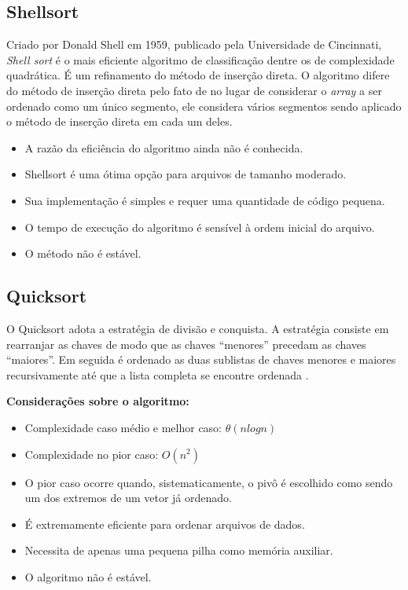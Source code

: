 \documentclass[
	11pt,
	oneside,
	a4paper,
	english,
	brazil,
	]{article}
\begin{document}
\subsection{Shellsort}
Criado por Donald Shell em 1959, publicado pela Universidade de Cincinnati,
\textit{Shell sort} é o mais eficiente algoritmo de classificação dentre os
de complexidade quadrática. É um refinamento do método de inserção direta.
O algoritmo difere do método de inserção direta pelo fato de no lugar de
considerar o \textit{array} a ser ordenado como um único segmento, ele
considera vários segmentos sendo aplicado o método de inserção direta em
cada um deles. \cite{shell}

\begin{itemize}
 \item A razão da eficiência do algoritmo ainda não é conhecida.
 \item Shellsort é uma ótima opção para arquivos de tamanho moderado.
 \item Sua implementação é simples e requer uma quantidade de código pequena.
 \item O tempo de execução do algoritmo é sensível à ordem inicial do arquivo.
 \item O método não é estável.
\end{itemize}

\subsection{Quicksort}
O Quicksort adota a estratégia de divisão e conquista. A estratégia
consiste em rearranjar as chaves de modo que as chaves ``menores''
precedam as chaves ``maiores''. Em seguida é ordenado as duas
sublistas de chaves menores e maiores recursivamente até que a lista
completa se encontre ordenada \cite{quick}.

\noindent \textbf{Considerações sobre o algoritmo:}
\begin{itemize}
 \item Complexidade caso médio e melhor caso: $ \theta(n log n) $
 \item Complexidade no pior caso: $ O(n^2) $
 \item O pior caso ocorre quando, sistematicamente, o pivô é escolhido como
sendo um dos extremos de um vetor já ordenado.
 \item É extremamente eficiente para ordenar arquivos de dados.
 \item Necessita de apenas uma pequena pilha como memória auxiliar.
 \item O algoritmo não é estável.
\end{itemize}
\end{document}
